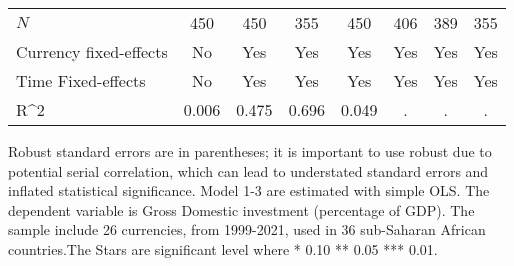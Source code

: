 \begin{table}[H]
\begin{adjustbox}{max width=\textwidth}
\begin{tabular}{l*{7}{c}}
\midrule
\(N\)       &         450         &         450         &         355         &         450         &         406         &         389         &         355         \\
Currency fixed-effects&          No         &         Yes         &         Yes         &         Yes         &         Yes         &         Yes         &         Yes         \\
Time Fixed-effects&          No         &         Yes         &         Yes         &         Yes         &         Yes         &         Yes         &         Yes         \\
R^{2}       &       0.006         &       0.475         &       0.696         &       0.049         &           .         &           .         &           .         \\
\bottomrule \end{tabular} \end{adjustbox}          \footnotesize \item Robust standard errors are in parentheses; it is important to use robust due to potential serial correlation, which can lead to understated standard errors and inflated statistical significance. Model 1-3 are estimated with simple OLS. The dependent variable is Gross Domestic investment (percentage of GDP). The sample include 26 currencies, from 1999-2021, used in 36 sub-Saharan African countries.The Stars are significant level where * 0.10 ** 0.05 *** 0.01. \end{table}
